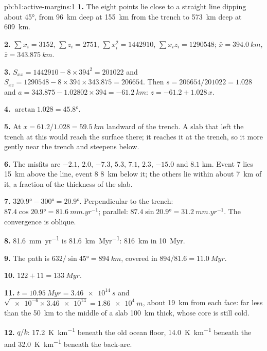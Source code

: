 \begin{solution}{pb:b1:active-margins:1}
\textbf{1.} The eight points lie close to a straight line dipping about
\ang{45}, from \qty{96}{km} deep at \qty{155}{km} from the trench to
\qty{573}{km} deep at \qty{609}{km}.

\textbf{2.} $\sum x_i = 3152$, $\sum z_i = 2751$, $\sum x_i^2 = \num{1442910}$,
$\sum x_i z_i = \num{1290548}$; $\bar x = \qty{394.0}{km}$,
$\bar z = \qty{343.875}{km}$.

\textbf{3.} $S_{xx} = 1442910 - 8\times394^2 = \num{201022}$ and
$S_{xz} = 1290548 - 8\times394\times343.875 = \num{206654}$. Then
$s = 206654/201022 = 1.028$ and $a = 343.875 - 1.02802\times394 =
\qty{-61.2}{km}$: $z = -61.2 + 1.028\,x$.

\textbf{4.} $\arctan1.028 = \ang{45.8}$.

\textbf{5.} At $x = 61.2/1.028 = \qty{59.5}{km}$ landward of the trench. A slab
that left the trench at this  would reach the surface there; it reaches it at
the trench, so it  more gently near the trench and steepens below.

\textbf{6.} The misfits are $-2.1$, $2.0$, $-7.3$, $5.3$, $7.1$, $2.3$,
$-15.0$ and $8.1$ \unit{km}. Event 7 lies \qty{15}{km} above the line, event 8
\qty{8}{km} below it; the others lie within about \qty{7}{km} of it, a fraction
of the thickness of the slab.

\textbf{7.} $\ang{320.9} - \ang{300} = \ang{20.9}$. Perpendicular to the
trench: $87.4\cos\ang{20.9} = \qty{81.6}{mm.yr^{-1}}$; parallel:
$87.4\sin\ang{20.9} = \qty{31.2}{mm.yr^{-1}}$. The convergence is oblique.

\textbf{8.} \qty{81.6}{mm.yr^{-1}} is \qty{81.6}{km.Myr^{-1}}: \qty{816}{km} in
\qty{10}{Myr}.

\textbf{9.} The path is $632/\sin\ang{45} = \qty{894}{km}$, covered in
$894/81.6 = \qty{11.0}{Myr}$.

\textbf{10.} $122 + 11 = \qty{133}{Myr}$.

\textbf{11.} $t = \qty{10.95}{Myr} = \qty{3.46e14}{s}$ and
$\sqrt{\num{e-6}\times\num{3.46e14}} = \qty{1.86e4}{m}$, about \qty{19}{km}
from each face: far less than the \qty{50}{km} to the middle of a slab
\qty{100}{km} thick, whose core is still cold.

\textbf{12.} $q/k$: \qty{17.2}{K.km^{-1}} beneath the old ocean floor,
\qty{14.0}{K.km^{-1}} beneath the  and \qty{32.0}{K.km^{-1}} beneath the
back-arc.


\end{solution}
